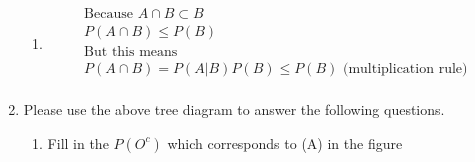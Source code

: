 \documentclass[krantz1,ChapterTOCs]{krantz}
\begin{document}
\begin{enumerate}
    \begin{enumerate}
        \item {\color{red}
            \begin{align*}
                \text{Because } A \cap B \subset B\\
                P( A \cap B ) \leq P(B) \\
                \text{But this means}\\
                P( A \cap B ) = P(A|B)P(B) \leq P(B) \text{ (multiplication rule)} \\
            \end{align*}
        }
    \end{enumerate}
   
   
   \clearpage
   \item \begin{figure}[ht!]
       \centering
   \end{figure} Please use the above tree diagram to answer the following questions. 
   \begin{enumerate}
       \item Fill in the $P(O^{c})$ which corresponds to (A) in the figure
       
       \begin{enumerate}
        \item {\color{red}
            \begin{align*}
                P(O^{c}) = 1-0.16 = 0.84
            \end{align*}
        \end{enumerate}
       

\end{enumerate}
\end{enumerate}
\end{document}
